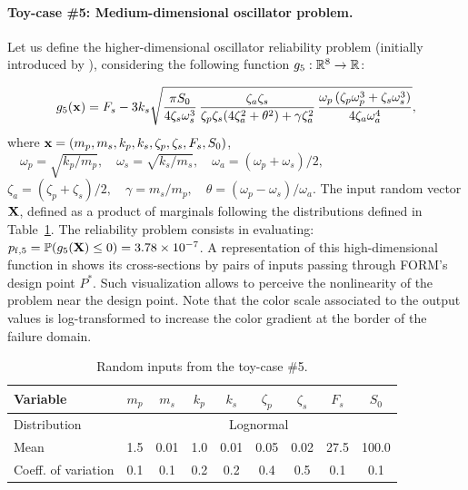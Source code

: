 \paragraph{Toy-case \#5: Medium-dimensional oscillator problem.}
Let us define the higher-dimensional oscillator reliability problem (initially introduced by \citealp{destefano_1990}), considering the following function $g_5 : \mathbb{R}^8 \rightarrow \mathbb{R}$:

\begin{equation}
    g_5({\bf x}) = F_s - 3 k_s \sqrt{\frac{\pi S_0}{4 \zeta_s \omega_s^3} \, \frac{\zeta_a \zeta_s}{\zeta_p \zeta_s (4 \zeta_a^2 + \theta^2) + \gamma \zeta_a^2} \, \frac{\omega_p \, (\zeta_p \omega_p^3 + \zeta_s \omega_s^3)}{4 \zeta_a \omega_a^4}},
\end{equation}
where ${\bf x} = \left(m_p, m_s, k_p, k_s, \zeta_p, \zeta_s, F_s, S_0\right)$,  
$\quad \omega_p=\sqrt{k_p/m_p}, \quad \omega_s=\sqrt{k_s/m_s}, \quad \omega_a = (\omega_p + \omega_s)/2, \quad $
$\zeta_a = (\zeta_p + \zeta_s)/2, \quad \gamma = m_s/m_p, \quad \theta= (\omega_p-\omega_s)/\omega_a$. 
The input random vector ${\bf X}$, defined as a product of marginals following the distributions defined in Table~\ref{tab:oscillator}. 
The reliability problem consists in evaluating: $p_{\mathrm{f}, 5} = \mathbb{P} ( g_5({\bf X}) \leq 0 ) =  3.78 \times 10^{-7}$.
A representation of this high-dimensional function in  shows its cross-sections by pairs of inputs passing through FORM's design point $P^*$. 
Such visualization allows to perceive the nonlinearity of the problem near the design point. 
Note that the color scale associated to the output values is log-transformed to increase the color gradient at the border of the failure domain. 


\begin{table}[h]
\centering
\begin{tabular}{ lcccccccc }
    \hline
    Variable            & $m_p$ & $m_s$ & $k_p$ & $k_s$ & $\zeta_p$ & $\zeta_s$ & $F_s$ & $S_0$ \\
    \hline          
    Distribution        &  \multicolumn{8}{c}{Lognormal} \\ 
    Mean                & 1.5 & 0.01 & 1.0 & 0.01 & 0.05 & 0.02 & 27.5 & 100.0\\ 
    Coeff. of variation & 0.1 & 0.1 & 0.2 & 0.2 & 0.4 & 0.5 & 0.1 & 0.1\\
    \hline
\end{tabular}
\caption{Random inputs from the toy-case \#5.}
\label{tab:oscillator}
\end{table}

